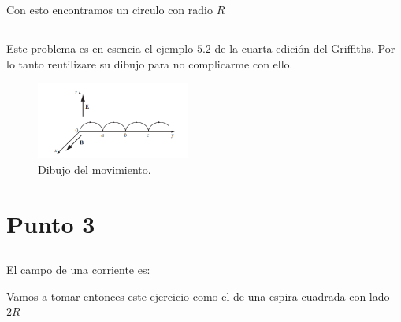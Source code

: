 \documentclass{report}
\begin{document}
Con esto encontramos un circulo con radio $R$

\section{}

Este problema es en esencia el ejemplo $5.2$ de la cuarta edición del Griffiths. Por lo tanto reutilizare su dibujo para no complicarme con ello.

\begin{figure}[H]
	\begin{center}
		\includegraphics[width=0.45\textwidth]{img/book_5_7.png}
	\end{center}
	\caption{Dibujo del movimiento.}\label{fig:book_5_7}
\end{figure}

\chapter{Punto 3}

\section{}

El campo de una corriente es:

Vamos a tomar entonces este ejercicio como el de una espira cuadrada con lado $2R$
\end{document}

